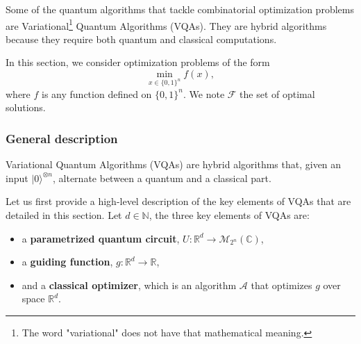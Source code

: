 Some of the quantum algorithms that tackle combinatorial optimization problems are Variational\footnote{The word "variational" does not have that mathematical meaning.} Quantum Algorithms (VQAs). They are hybrid algorithms because they require both quantum and classical computations. 


In this section, we consider optimization problems of the form
\begin{equation*}
\min _{x \in\{0,1\}^{n}} f(x), \tag{1}
\end{equation*}
where $f$ is any function defined on $\{0,1\}^{n}$. We note $\mathcal{F}$ the set of optimal solutions.

\subsubsection{General description}

Variational Quantum Algorithms (VQAs) are hybrid algorithms that, given an input $|0\rangle^{\otimes n}$, alternate between a quantum and a classical part. 

Let us first provide a high-level description of the key elements of VQAs that are detailed in this section. Let $d \in \mathbb{N}$, the three key elements of VQAs are:

\begin{itemize}
  \item a \textbf{parametrized quantum circuit}, $U: \mathbb{R}^{d} \rightarrow \mathcal{M}_{2^{n}}(\mathbb{C})$,
  \item a \textbf{guiding function}, $g: \mathbb{R}^{d} \rightarrow \mathbb{R}$,
  \item and a \textbf{classical optimizer}, which is an algorithm $\mathcal{A}$ that optimizes $g$ over space $\mathbb{R}^{d}$.
\end{itemize}

